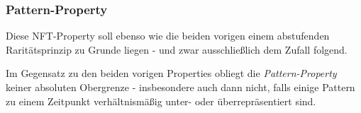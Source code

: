 
\subsubsection{Pattern-Property}

\vspace{0.3cm}

\begin{sloppypar}
Diese NFT-Property soll ebenso wie die beiden vorigen einem abstufenden Raritätsprinzip zu Grunde liegen - und zwar ausschließlich dem Zufall folgend.
\end{sloppypar}

Im Gegensatz zu den beiden vorigen Properties obliegt die \textit{Pattern-Property} keiner absoluten Obergrenze - insbesondere auch dann nicht, falls einige Pattern zu einem Zeitpunkt verhältnismäßig unter- oder überrepräsentiert sind.

\vspace{0.3cm}

